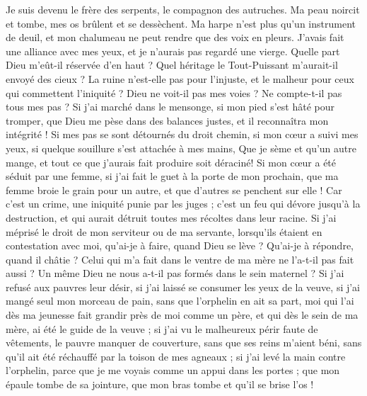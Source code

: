 \begin{multicols}{2}
Je suis devenu le frère des serpents, le compagnon des autruches.
Ma peau noircit et tombe, mes os brûlent et se dessèchent.
Ma harpe n'est plus qu'un instrument de deuil, et mon chalumeau ne peut rendre que des voix en pleurs.
\VerseOne{}J'avais fait une alliance avec mes yeux, et je n'aurais pas regardé une vierge.
Quelle part Dieu m'eût-il réservée d'en haut ? Quel héritage le Tout-Puissant m'aurait-il envoyé des cieux ?
La ruine n'est-elle pas pour l'injuste, et le malheur pour ceux qui commettent l'iniquité ?
Dieu ne voit-il pas mes voies ? Ne compte-t-il pas tous mes pas ?
Si j'ai marché dans le mensonge, si mon pied s'est hâté pour tromper,
que Dieu me pèse dans des balances justes, et il reconnaîtra mon intégrité !
Si mes pas se sont détournés du droit chemin, si mon cœur a suivi mes yeux, si quelque souillure s'est attachée à mes mains,
Que je sème et qu'un autre mange, et tout ce que j'aurais fait produire soit déraciné!
Si mon cœur a été séduit par une femme, si j'ai fait le guet à la porte de mon prochain,
que ma femme broie le grain pour un autre, et que d'autres se penchent sur elle !
Car c'est un crime, une iniquité punie par les juges ;
c'est un feu qui dévore jusqu'à la destruction, et qui aurait détruit toutes mes récoltes dans leur racine.
Si j'ai méprisé le droit de mon serviteur ou de ma servante, lorsqu'ils étaient en contestation avec moi,
qu'ai-je à faire, quand Dieu se lève ? Qu'ai-je à répondre, quand il châtie ?
Celui qui m'a fait dans le ventre de ma mère ne l'a-t-il pas fait aussi ? Un même Dieu ne nous a-t-il pas formés dans le sein maternel ?
Si j'ai refusé aux pauvres leur désir, si j'ai laissé se consumer les yeux de la veuve,
si j'ai mangé seul mon morceau de pain, sans que l'orphelin en ait sa part,
moi qui l'ai dès ma jeunesse fait grandir près de moi comme un père, et qui dès le sein de ma mère, ai été le guide de la veuve ;
si j'ai vu le malheureux périr faute de vêtements, le pauvre manquer de couverture,
sans que ses reins m'aient béni, sans qu'il ait été réchauffé par la toison de mes agneaux ;
si j'ai levé la main contre l'orphelin, parce que je me voyais comme un appui dans les portes ;
que mon épaule tombe de sa jointure, que mon bras tombe et qu'il se brise l'os !

\end{multicols}
